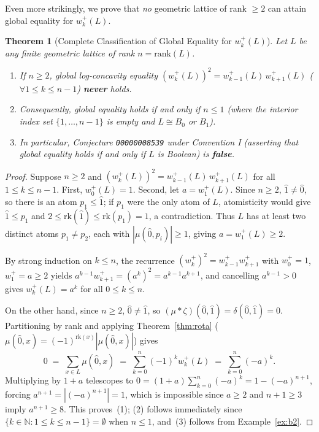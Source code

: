 \documentclass[11pt]{article}
\newtheorem{theorem}{Theorem}[section]
\theoremstyle{definition}
\theoremstyle{remark}
\newcommand{\rk}{\mathrm{rk}}
\newcommand{\hatzero}{\hat{0}}
\newcommand{\hatone}{\hat{1}}
\newcommand{\N}{\mathbb{N}}
\begin{document}
Even more strikingly, we prove that \emph{no} geometric lattice of rank $\ge 2$ can attain global equality for $w_k^+(L)$.

\begin{theorem}[Complete Classification of Global Equality for $w_k^+(L)$]
\label{thm:whitney-class}
Let $L$ be any finite geometric lattice of rank $n = \mathrm{rank}(L)$.
\begin{enumerate}
  \item If $n \ge 2$, global log-concavity equality $(w_k^+(L))^2 = w_{k-1}^+(L)\,w_{k+1}^+(L)$ ($\forall 1 \le k \le n-1$) \textbf{never} holds.
  \item Consequently, global equality holds if and only if $n \le 1$ (where the interior index set $\{1,\dots,n-1\}$ is empty and $L \cong B_0$ or $B_1$).
  \item In particular, Conjecture \texttt{00000008539} under Convention I (asserting that global equality holds if and only if $L$ is Boolean) is \textbf{false}.
\end{enumerate}
\end{theorem}

\begin{proof}
Suppose $n \ge 2$ and $(w_k^+(L))^2 = w_{k-1}^+(L)\,w_{k+1}^+(L)$ for all $1 \le k \le n-1$. First, $w_0^+(L) = 1$. Second, let $a = w_1^+(L)$. Since $n \ge 2$, $\hatone \neq \hatzero$, so there is an atom $p_1 \le \hatone$; if $p_1$ were the only atom of $L$, atomisticity would give $\hatone \le p_1$ and $2 \le \rk(\hatone) \le \rk(p_1) = 1$, a contradiction. Thus $L$ has at least two distinct atoms $p_1 \neq p_2$, each with $|\mu(\hatzero, p_i)| \ge 1$, giving $a = w_1^+(L) \ge 2$.

By strong induction on $k \le n$, the recurrence $(w_k^+)^2 = w_{k-1}^+ w_{k+1}^+$ with $w_0^+ = 1$, $w_1^+ = a \ge 2$ yields $a^{k-1} w_{k+1}^+ = (a^k)^2 = a^{k-1} a^{k+1}$, and cancelling $a^{k-1} > 0$ gives $w_k^+(L) = a^k$ for all $0 \le k \le n$.

On the other hand, since $n \ge 2$, $\hatzero \neq \hatone$, so $(\mu * \zeta)(\hatzero, \hatone) = \delta(\hatzero, \hatone) = 0$. Partitioning by rank and applying Theorem~\ref{thm:rota} ($\mu(\hatzero, x) = (-1)^{\rk(x)} |\mu(\hatzero, x)|$) gives
\[
  0 \;=\; \sum_{x \in L} \mu(\hatzero, x) \;=\; \sum_{k=0}^n (-1)^k w_k^+(L) \;=\; \sum_{k=0}^n (-a)^k.
\]
Multiplying by $1 + a$ telescopes to $0 = (1 + a) \sum_{k=0}^n (-a)^k = 1 - (-a)^{n+1}$, forcing $a^{n+1} = |(-a)^{n+1}| = 1$, which is impossible since $a \ge 2$ and $n + 1 \ge 3$ imply $a^{n+1} \ge 8$. This proves~(1); (2) follows immediately since $\{k \in \N : 1 \le k \le n-1\} = \emptyset$ when $n \le 1$, and~(3) follows from Example~\ref{ex:b2}.
\end{proof}
\end{document}

